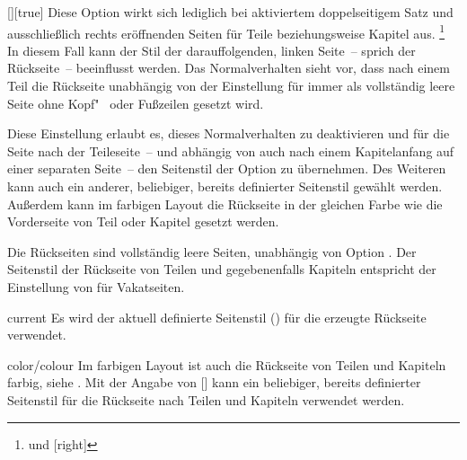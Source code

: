 \begin{Declaration}{[\PSet]}[true]%
\printdeclarationlist%
%
%
%
%
Diese Option wirkt sich lediglich bei aktiviertem doppelseitigem Satz und 
ausschließlich rechts eröffnenden Seiten für Teile beziehungsweise Kapitel
aus.%
\footnote{ und [right]}
In diesem Fall kann der Stil der darauffolgenden, linken Seite~-- sprich der 
Rückseite~-- beeinflusst werden. Das Normalverhalten sieht vor, dass nach einem 
Teil die Rückseite unabhängig von der Einstellung für  
immer als vollständig leere Seite ohne Kopf"~ oder Fußzeilen gesetzt wird.

Diese Einstellung erlaubt es, dieses Normalverhalten zu deaktivieren und für 
die Seite nach der Teileseite~-- und abhängig von  
auch nach einem Kapitelanfang auf einer separaten Seite~-- den Seitenstil der 
Option  zu übernehmen. Des Weiteren kann auch ein 
anderer, beliebiger, bereits definierter Seitenstil gewählt werden. Außerdem
kann im farbigen Layout die Rückseite in der gleichen Farbe wie die 
Vorderseite von Teil oder Kapitel gesetzt werden. \notudscrartcl
%
\begin{values}
\itemfalse
  Die Rückseiten sind vollständig leere Seiten, unabhängig von Option
  .
\itemtrue*
  Der Seitenstil der Rückseite von Teilen und gegebenenfalls Kapiteln 
  entspricht der Einstellung von  für Vakatseiten.
\item[current]
  Es wird der aktuell definierte Seitenstil () für die 
  erzeugte Rückseite verwendet.
\item[color/colour]
  Im farbigen Layout ist auch die Rückseite von Teilen und Kapiteln farbig, 
  siehe .
\makeatletter{}\makeatother
  Mit der Angabe von [] 
  kann ein beliebiger, bereits definierter Seitenstil für die Rückseite nach 
  Teilen und Kapiteln verwendet werden.
\end{values}
\end{Declaration}

